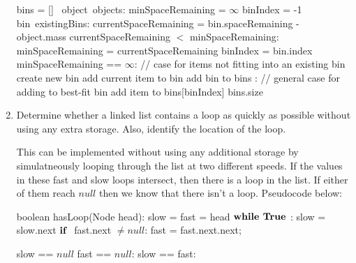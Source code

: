 \documentclass[12pt]{article}
\begin{document}
\begin{enumerate}
          \tabto{0cm}bins = []
          \tabto{0cm}\For\ object\ \In objects:
          \tabto{1cm}minSpaceRemaining = $\infty$
          \tabto{1cm}binIndex = -1
          \tabto{1cm}\For bin\ \In existingBins:
          \tabto{2cm} currentSpaceRemaining = bin.spaceRemaining - object.mass
          \tabto{2cm} \If currentSpaceRemaining $<$ minSpaceRemaining:
          \tabto{3cm} minSpaceRemaining = currentSpaceRemaining
          \tabto{3cm} binIndex = bin.index
          \tabto{1cm} \If minSpaceRemaining == $\infty$:
          \tabto{2cm} // case for items not fitting into an existing bin
          \tabto{2cm} create new bin
          \tabto{2cm} add current item to bin
          \tabto{2cm} add bin to bins
          \tabto{1cm} \Else:
          \tabto{2cm} // general case for adding to best-fit bin
          \tabto{2cm} add item to bins[binIndex]
          \tabto{0cm}\Return bins.size

    \item Determine whether a linked list contains a loop as quickly as possible
          without using any extra storage. Also, identify the location of the loop.

          This can be implemented without using any additional storage by simulatneously
          looping through the list at two different speeds. If the values in these fast
          and slow loops intersect, then there is a loop in the list. If either of them
          reach $null$ then we know that there isn't a loop. Pseudocode below:

          \tabto{0cm}boolean hasLoop(Node head):
          \tabto{1cm}slow = fast = head
          \tabto{1cm}$\mbox{\bf while\ } \mbox{\bf True\ }$:
          \tabto{2cm}slow = slow.next
          \tabto{2cm}$\mbox{\bf if\ }$ fast.next $\neq null$:
          \tabto{3cm}fast = fast.next.next;
          \tabto{2cm}\Else \Return \False

          \tabto{2cm}\If slow == $null$ \Or fast == $null$:
          \tabto{3cm}\Return \False
          \tabto{2cm}\If slow == fast:
          \tabto{3cm}\Return \True

\end{enumerate}
\end{document}
